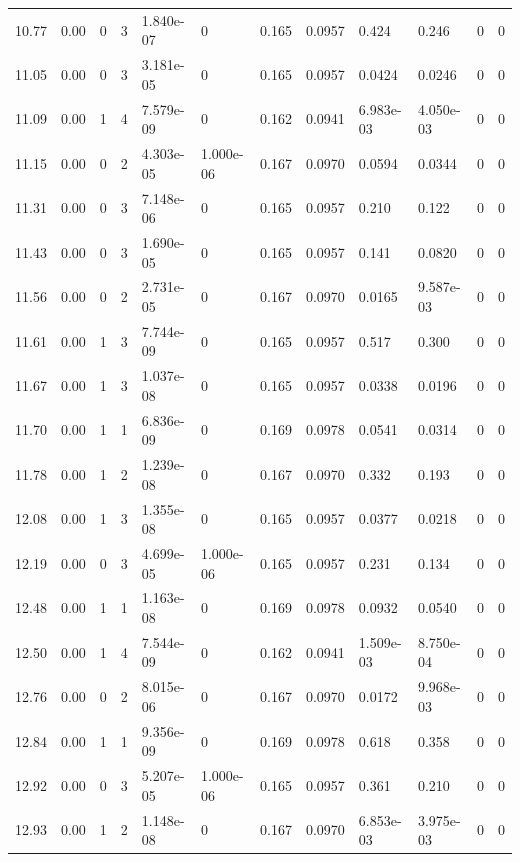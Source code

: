 \documentclass[preview]{standalone}
\begin{document}
{{{\begin{tabular}{L{1.2cm}C{1.2cm} C{0.3cm}C{0.5cm} C{1.4cm}C{1.4cm} C{1.4cm}C{1.4cm} C{1.6cm}C{1.6cm} C{1.6cm}C{1.6cm}}
  10.77  &  0.00  & 0     &  3 &  1.840e-07  & 0  &  0.165&   0.0957& 0.424 & 0.246   &  0 & 0  \\ 
  11.05  &  0.00  & 0     &  3 &  3.181e-05  & 0  &  0.165&   0.0957& 0.0424 & 0.0246   &  0 & 0  \\ 
  11.09  &  0.00  & 1     &  4 &  7.579e-09  & 0  &  0.162&   0.0941& 6.983e-03 & 4.050e-03   &  0 & 0  \\ 
  11.15  &  0.00  & 0     &  2 &  4.303e-05  & 1.000e-06  &  0.167&   0.0970& 0.0594 & 0.0344   &  0 & 0  \\ 
  11.31  &  0.00  & 0     &  3 &  7.148e-06  & 0  &  0.165&   0.0957& 0.210 & 0.122   &  0 & 0  \\ 
  11.43  &  0.00  & 0     &  3 &  1.690e-05  & 0  &  0.165&   0.0957& 0.141 & 0.0820   &  0 & 0  \\ 
  11.56  &  0.00  & 0     &  2 &  2.731e-05  & 0  &  0.167&   0.0970& 0.0165 & 9.587e-03   &  0 & 0  \\ 
  11.61  &  0.00  & 1     &  3 &  7.744e-09  & 0  &  0.165&   0.0957& 0.517 & 0.300   &  0 & 0  \\ 
  11.67  &  0.00  & 1     &  3 &  1.037e-08  & 0  &  0.165&   0.0957& 0.0338 & 0.0196   &  0 & 0  \\ 
  11.70  &  0.00  & 1     &  1 &  6.836e-09  & 0  &  0.169&   0.0978& 0.0541 & 0.0314   &  0 & 0  \\ 
  11.78  &  0.00  & 1     &  2 &  1.239e-08  & 0  &  0.167&   0.0970& 0.332 & 0.193   &  0 & 0  \\ 
  12.08  &  0.00  & 1     &  3 &  1.355e-08  & 0  &  0.165&   0.0957& 0.0377 & 0.0218   &  0 & 0  \\ 
  12.19  &  0.00  & 0     &  3 &  4.699e-05  & 1.000e-06  &  0.165&   0.0957& 0.231 & 0.134   &  0 & 0  \\ 
  12.48  &  0.00  & 1     &  1 &  1.163e-08  & 0  &  0.169&   0.0978& 0.0932 & 0.0540   &  0 & 0  \\ 
  12.50  &  0.00  & 1     &  4 &  7.544e-09  & 0  &  0.162&   0.0941& 1.509e-03 & 8.750e-04   &  0 & 0  \\ 
  12.76  &  0.00  & 0     &  2 &  8.015e-06  & 0  &  0.167&   0.0970& 0.0172 & 9.968e-03   &  0 & 0  \\ 
  12.84  &  0.00  & 1     &  1 &  9.356e-09  & 0  &  0.169&   0.0978& 0.618 & 0.358   &  0 & 0  \\ 
  12.92  &  0.00  & 0     &  3 &  5.207e-05  & 1.000e-06  &  0.165&   0.0957& 0.361 & 0.210   &  0 & 0  \\ 
  12.93  &  0.00  & 1     &  2 &  1.148e-08  & 0  &  0.167&   0.0970& 6.853e-03 & 3.975e-03   &  0 & 0  \\ 

\end{tabular}}}}
\end{document}

